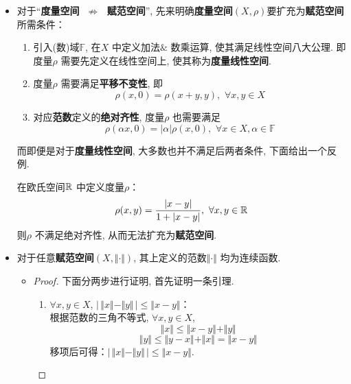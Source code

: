 \begin{defn}
\begin{rmk}
\begin{itemize}
				\newpage
				
				\item 对于“\textbf{度量空间} $\,\, \not\Rightarrow \,\,$ \textbf{赋范空间}”, 先来明确\textbf{度量空间$(X , \rho)$}要扩充为\textbf{赋范空间}所需条件：
				
				\vspace*{1em}
				
				\begin{enumerate}
					\item 引入(数)域$\mathbb{F}$, 在$X$ 中定义加法$\&$ 数乘运算, 使其满足线性空间八大公理. 即度量$\rho$ 需要先定义在线性空间上, 使其称为\textbf{度量线性空间}. 
					
					\vspace*{0.5em}
					
					\item 度量$\rho$ 需要满足\textbf{平移不变性}, 即
					\[ \rho(x , 0) = \rho(x + y , y) , \,\, \forall x , y \in X \]
					
					\item 对应\textbf{范数}定义的\textbf{绝对齐性}, 度量$\rho$ 也需要满足
					\[ \rho(\alpha x , 0) = \left| \alpha \right| \rho(x , 0) , \,\, \forall x \in X , \alpha \in \mathbb{F} \]
				\end{enumerate}
				
				\vspace*{1em}
				
				而即便是对于\textbf{度量线性空间}, 大多数也并不满足后两者条件, 下面给出一个反例.
				
				\begin{example}\label{ex 2.1.1}
					在欧氏空间$\mathbb{R}$ 中定义度量$\rho$：
					\[ \rho(x , y) = \frac{\left| x - y \right|}{1 + \left| x - y \right|} , \,\, \forall x , y \in \mathbb{R} \]
					则$\rho$ 不满足绝对齐性, 从而无法扩充为\textbf{赋范空间}.
				\end{example}
				
				\vspace*{6em}
				
				\item 对于任意\textbf{赋范空间}$(X , \Vert \cdot \Vert)$, 其上定义的范数$\Vert \cdot \Vert$ 均为连续函数.
				
				\begin{itemize}
					\item 
					\begin{proof}
						下面分两步进行证明, 首先证明一条引理. 
						\begin{enumerate}
							\item $\forall x , y \in X$, $\Big| \, \Vert x \Vert - \Vert y \Vert \, \Big| \leq \Vert x - y \Vert$：\\
							根据范数的三角不等式, $\forall x , y \in X$,
							\[ \Vert x \Vert \leq \Vert x - y \Vert + \Vert y \Vert \]
							\[ \Vert y \Vert \leq \Vert y - x \Vert + \Vert x \Vert = \Vert x - y \Vert \]
							移项后可得：$\Big| \, \Vert x \Vert - \Vert y \Vert \, \Big| \leq \Vert x - y \Vert$.
							

\end{enumerate}
\end{proof}
\end{itemize}
\end{itemize}
\end{rmk}
\end{defn}
